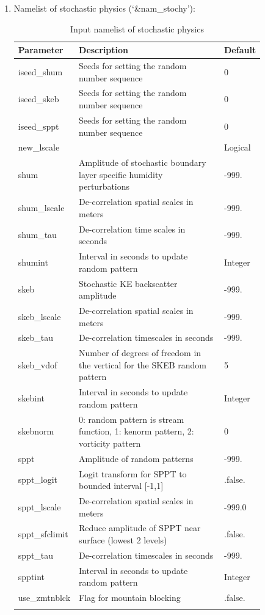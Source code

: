 \documentclass[11pt,fleqn]{report}              %
\begin{document}
\begin{enumerate}
\item Namelist of stochastic physics (`\&nam\_stochy'):
{
\scriptsize
\begin{longtable}{p{0.11\linewidth} | p{0.65\linewidth} | p{0.08\linewidth} }
\hline
\hline
Parameter & Description & Default \\
\hline
 iseed\_shum & Seeds for setting the random number sequence & 0 \\
 iseed\_skeb & Seeds for setting the random number sequence & 0 \\
 iseed\_sppt & Seeds for setting the random number sequence & 0 \\
 new\_lscale & & Logical \\
 shum & Amplitude of stochastic boundary layer specific humidity perturbations & -999. \\
 shum\_lscale & De-correlation spatial scales in meters & -999. \\
 shum\_tau & De-correlation time scales in seconds & -999. \\
 shumint & Interval in seconds to update random pattern & Integer \\
 skeb & Stochastic KE backscatter amplitude & -999. \\
 skeb\_lscale & De-correlation spatial scales in meters & -999. \\
 skeb\_tau & De-correlation timescales in seconds & -999. \\
 skeb\_vdof & Number of degrees of freedom in the vertical for the SKEB random pattern & 5 \\
 skebint & Interval in seconds to update random pattern & Integer \\
 skebnorm & 0: random pattern is stream function, 1: kenorm pattern, 2: vorticity pattern & 0 \\
 sppt & Amplitude of random patterns & -999. \\
 sppt\_logit & Logit transform for SPPT to bounded interval [-1,1] & .false. \\
 sppt\_lscale & De-correlation spatial scales in meters & -999.0 \\
 sppt\_sfclimit & Reduce amplitude of SPPT near surface (lowest 2 levels) & .false. \\
 sppt\_tau & De-correlation timescales in seconds & -999. \\
 spptint & Interval in seconds to update random pattern & Integer \\
 use\_zmtnblck & Flag for mountain blocking & .false. \\
\hline
\caption{Input namelist of stochastic physics}
\label{table:fv3_input_nml_stochy}
\end{longtable}
}


\end{enumerate}
\end{document}
